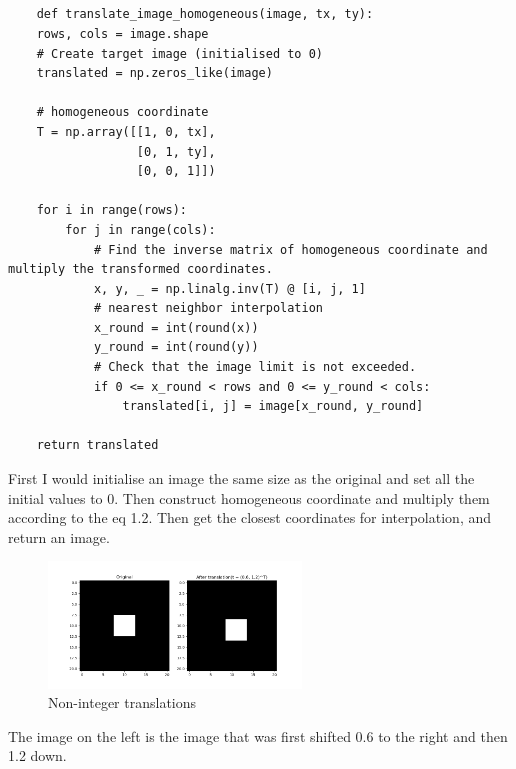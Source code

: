 \documentclass[12pt]{article}
\begin{document}
\subsection{}
\begin{lstlisting}
    def translate_image_homogeneous(image, tx, ty):
    rows, cols = image.shape
    # Create target image (initialised to 0)
    translated = np.zeros_like(image)
    
    # homogeneous coordinate
    T = np.array([[1, 0, tx],
                  [0, 1, ty],
                  [0, 0, 1]])
    
    for i in range(rows):
        for j in range(cols):
            # Find the inverse matrix of homogeneous coordinate and multiply the transformed coordinates.
            x, y, _ = np.linalg.inv(T) @ [i, j, 1]
            # nearest neighbor interpolation
            x_round = int(round(x))
            y_round = int(round(y))
            # Check that the image limit is not exceeded.
            if 0 <= x_round < rows and 0 <= y_round < cols:
                translated[i, j] = image[x_round, y_round]
    
    return translated
\end{lstlisting}
First I would initialise an image the same size as the original and set all the initial values to 0. Then construct homogeneous coordinate and multiply them according to the eq 1.2. Then get the closest coordinates for interpolation, and return an image.
\begin{figure}[ht]
    \centering
    \includegraphics[width=0.6\textwidth]{pics/a6_1.6.png} 
    \caption{Non-integer translations}
\end{figure}


The image on the left is the image that was first shifted 0.6 to the right and then 1.2 down.
\newpage
\end{document}

